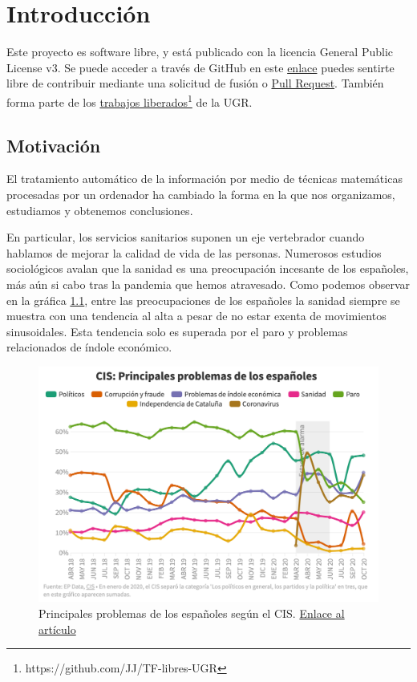 \chapter{Introducción}
Este proyecto es software libre, y está publicado con la licencia \cite{gplv3} General
Public License v3. Se puede acceder a través de GitHub en este
\href{https://github.com/pablojjimenez/TFG}{enlace} puedes sentirte libre de contribuir
mediante una solicitud de fusión o \href{https://github.com/pablojjimenez/TFG/pulls}{Pull
Request}. También forma parte de los \href{https://github.com/JJ/TF-libres-UGR}{trabajos
liberados}\footnote{https://github.com/JJ/TF-libres-UGR} de la UGR.

\section{Motivación} 
El tratamiento automático de la información por medio de técnicas matemáticas procesadas
por un ordenador ha cambiado la forma en la que nos organizamos, estudiamos y obtenemos
conclusiones.

En particular, los servicios sanitarios suponen un eje vertebrador cuando hablamos de
mejorar la calidad de vida de las personas. Numerosos estudios sociológicos avalan que la
sanidad es una preocupación incesante de los españoles, más aún si cabo tras la pandemia
que hemos atravesado. Como podemos observar en la gráfica \ref{fig:problemascis}, entre
las preocupaciones de los españoles la sanidad siempre se muestra con una tendencia al
alta a pesar de no estar exenta de movimientos sinusoidales. Esta tendencia solo es
superada por el paro y problemas relacionados de índole económico.

\FloatBarrier
\begin{figure}[]
	\centering	
	\includegraphics[scale=0.5]{doc/logos/imgs/CIS_1.png}
	\caption{ Principales problemas de los españoles según el CIS.
        \href{https://www.rtve.es/noticias/20201015/crisis-economica-coronavirus-preocupan-ahora-mas-espanoles-paro/2045610.shtml}{Enlace
        al artículo} }
    \label{fig:problemascis}
\end{figure}
\FloatBarrier

